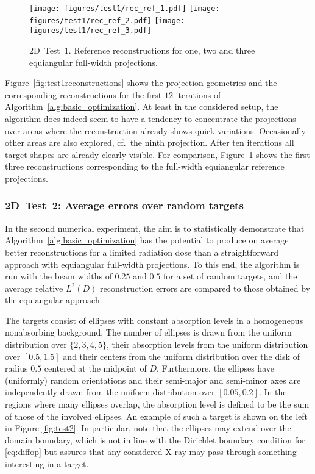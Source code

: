 \documentclass[final]{siamltex}
\begin{document}
\begin{figure}
	\centering
  \texttt{[image: figures/test1/rec\_ref\_1.pdf]}
  \texttt{[image: figures/test1/rec\_ref\_2.pdf]}
  \texttt{[image: figures/test1/rec\_ref\_3.pdf]}
	\caption{{\sc 2D~Test~1.} Reference reconstructions for one, two and three equiangular full-width projections.}
	\label{fig:test1reconstructions_ref}
\end{figure}

Figure~\ref{fig:test1reconstructions} shows the projection geometries and the corresponding reconstructions for the first $12$ iterations of Algorithm~\ref{alg:basic_optimization}. At least in the considered setup, the algorithm does indeed seem to have a tendency to concentrate the projections over areas where the reconstruction already shows quick variations. Occasionally other areas are also explored, cf.~the ninth projection. After ten iterations all target shapes are already clearly visible. For comparison, Figure~\ref{fig:test1reconstructions_ref} shows the first three reconstructions corresponding to the full-width equiangular reference projections.




\subsubsection{2D~Test~2: Average errors over random targets}
In the second numerical experiment, the aim is to statistically demonstrate that Algorithm~\ref{alg:basic_optimization} has the potential to produce on average better reconstructions for a limited radiation dose than a straightforward approach with equiangular full-width projections. To this end, the algorithm is run with the beam widths of $0.25$ and $0.5$ for a set of random targets, and the average relative $L^2(D)$ reconstruction errors are compared to those obtained by the equiangular approach.

The targets consist of ellipses with constant absorption levels in a homogeneous nonabsorbing background. The number of ellipses is drawn from the uniform distribution over $\{2, 3, 4, 5 \}$, their absorption levels from the uniform distribution over $[0.5,1.5]$ and their centers from the uniform distribution over the disk of radius $0.5$ centered at the midpoint of $D$. Furthermore, the ellipses have (uniformly) random orientations and their semi-major and semi-minor axes are independently drawn from the uniform distribution over $[0.05,0.2]$. In the regions where many ellipses overlap, the absorption level is defined to be the sum of those of the involved ellipses. An example of such a target is shown on the left in Figure \ref{fig:test2}. In particular, note that the ellipses may extend over the domain boundary, which is not in line with the Dirichlet boundary condition for \eqref{eq:diffop} but assures that any considered X-ray may pass through something interesting in a target.
\end{document}

